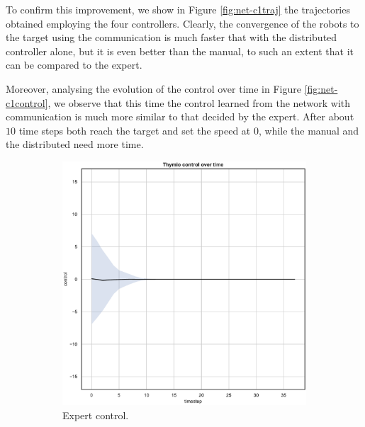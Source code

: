To confirm this improvement, we show in Figure \ref{fig:net-c1traj} the 
trajectories obtained employing the four controllers. 
Clearly, the convergence of the robots to the target using the communication is 
much faster that with the distributed controller alone, but it is even better than 
the manual, to such an extent that it can be compared to the expert.

Moreover, analysing the evolution of the control over time in Figure 
\ref{fig:net-c1control}, we observe that this time the control learned from the 
network with communication is much more similar to that decided by the expert.
After about $10$ time steps both reach the target and set the speed at $0$, while 
the manual and the distributed need more time.
\begin{figure}[!htb]
	\begin{center}
		\begin{subfigure}[h]{0.35\textwidth}
			\includegraphics[width=\textwidth]{contents/images/net-d1/control-overtime-omniscient}%
			\caption{Expert control.}
		\end{subfigure}
		\hspace{1cm}
		\begin{subfigure}[h]{0.35\textwidth}

\end{subfigure}
\end{center}
\end{figure}
